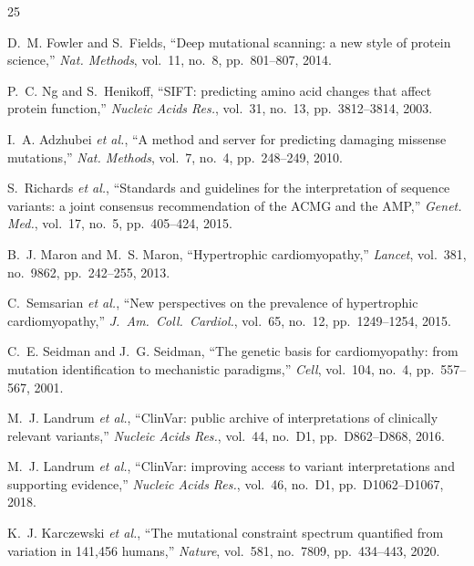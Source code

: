 \documentclass[conference]{IEEEtran}
\begin{document}
\begin{thebibliography}{25}

D.~M. Fowler and S.~Fields,
``Deep mutational scanning: a new style of protein science,''
\textit{Nat. Methods}, vol.~11, no.~8, pp.~801--807, 2014.

P.~C. Ng and S.~Henikoff,
``SIFT: predicting amino acid changes that affect protein function,''
\textit{Nucleic Acids Res.}, vol.~31, no.~13, pp.~3812--3814, 2003.

I.~A. Adzhubei \textit{et al.},
``A method and server for predicting damaging missense mutations,''
\textit{Nat. Methods}, vol.~7, no.~4, pp.~248--249, 2010.

S.~Richards \textit{et al.},
``Standards and guidelines for the interpretation of sequence variants:
a joint consensus recommendation of the ACMG and the AMP,''
\textit{Genet. Med.}, vol.~17, no.~5, pp.~405--424, 2015.

B.~J. Maron and M.~S. Maron,
``Hypertrophic cardiomyopathy,''
\textit{Lancet}, vol.~381, no.~9862, pp.~242--255, 2013.

C.~Semsarian \textit{et al.},
``New perspectives on the prevalence of hypertrophic cardiomyopathy,''
\textit{J.\ Am.\ Coll.\ Cardiol.}, vol.~65, no.~12,
pp.~1249--1254, 2015.

C.~E. Seidman and J.~G. Seidman,
``The genetic basis for cardiomyopathy: from mutation identification
to mechanistic paradigms,''
\textit{Cell}, vol.~104, no.~4, pp.~557--567, 2001.

M.~J. Landrum \textit{et al.},
``ClinVar: public archive of interpretations of clinically relevant
variants,''
\textit{Nucleic Acids Res.}, vol.~44, no.~D1,
pp.~D862--D868, 2016.

M.~J. Landrum \textit{et al.},
``ClinVar: improving access to variant interpretations and supporting
evidence,''
\textit{Nucleic Acids Res.}, vol.~46, no.~D1,
pp.~D1062--D1067, 2018.

K.~J. Karczewski \textit{et al.},
``The mutational constraint spectrum quantified from variation in
141,456 humans,''
\textit{Nature}, vol.~581, no.~7809, pp.~434--443, 2020.


\end{thebibliography}
\end{document}
